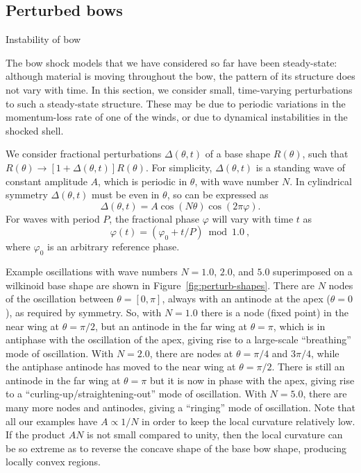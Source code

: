 \subsection{Perturbed bows}
\label{sec:perturbed-bows}

Instability of bow \citep{Blondin:1998a}

The bow shock models that we have considered so far have been
steady-state: although material is moving throughout the bow, the
pattern of its structure does not vary with time.  In this section, we
consider small, time-varying perturbations to such a steady-state
structure.  These may be due to periodic variations in the
momentum-loss rate of one of the winds, or due to dynamical
instabilities in the shocked shell.

We consider fractional perturbations \(\Delta(\theta, t)\) of a base shape
\(R(\theta)\), such that
\(R(\theta) \to [1 + \Delta(\theta, t)] R(\theta)\).  For simplicity,
\(\Delta(\theta, t)\) is a standing wave of constant amplitude \(A\), which is
periodic in \(\theta\), with wave number \(N\).  In cylindrical symmetry
\(\Delta(\theta, t)\) must be even in \(\theta\), so can be expressed as
\begin{equation}
  \label{eq:standing-wave}
  \Delta(\theta, t) = A \cos(N \theta) \cos(2\pi \varphi) . 
\end{equation}
For waves with period \(P\), the fractional phase \(\varphi\) will
vary with time \(t\) as
\begin{equation}
  \label{eq:fractional-phase}
  \varphi(t) = (\varphi_0 + t/P) \bmod 1.0\ ,
\end{equation}
where \(\varphi_0\) is an arbitrary reference phase.

Example oscillations with wave numbers \(N = 1.0\), \(2.0\), and
\(5.0\) superimposed on a wilkinoid base shape are shown in
Figure~\ref{fig:perturb-shapes}.  There are \(N\) nodes of the
oscillation between \(\theta = [0, \pi]\), always with an antinode at the apex
(\(\theta = 0\)), as required by symmetry.  So, with \(N = 1.0\) there is a
node (fixed point) in the near wing at \(\theta = \pi/2\), but an antinode in
the far wing at \(\theta = \pi\), which is in antiphase with the oscillation
of the apex, giving rise to a large-scale ``breathing'' mode of
oscillation.  With \(N = 2.0\), there are nodes at \(\theta = \pi/4\) and
\(3\pi/4\), while the antiphase antinode has moved to the near wing at
\(\theta = \pi/2\).  There is still an antinode in the far wing at
\(\theta = \pi\) but it is now in phase with the apex, giving rise to a
``curling-up/straightening-out'' mode of oscillation.  With
\(N = 5.0\), there are many more nodes and antinodes, giving a
``ringing'' mode of oscillation.  Note that all our examples have
\(A \propto 1/N\) in order to keep the local curvature relatively low.  If
the product \(A N\) is not small compared to unity, then the local
curvature can be so extreme as to reverse the concave shape of the
base bow shape, producing locally convex regions.

